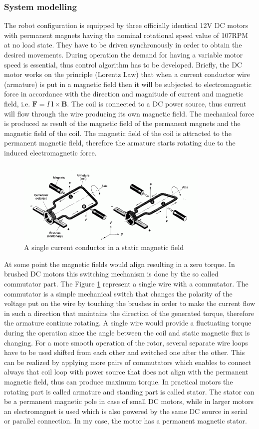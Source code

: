\documentclass[12pt,english]{article}
\begin{document}
\subsubsection{System modelling}
The robot configuration is equipped by three officially identical 12V DC motors with permanent magnets having the nominal rotational speed value of 107RPM at no load state. They have to be driven synchronously in order to obtain the desired movements. During operation the demand for having a variable motor speed is essential, thus control algorithm has to be developed. 
Briefly, the DC motor works on the principle (Lorentz Law) that when a current conductor wire (armature) is put in a magnetic field then it will be subjected to electromagnetic force in accordance with the direction and magnitude of current and magnetic field, i.e. $\mathbf{F} = I~\mathbf{l} \times \mathbf{B}$. The coil is connected to a DC power source, thus current will flow through the wire producing its own magnetic field. The mechanical force is produced as result of the magnetic field of the permanent magnets and the magnetic field of the coil. The magnetic field of the coil is attracted to the permanent magnetic field, therefore the armature starts rotating due to the induced electromagnetic force.
\begin{figure}[htb!]
	\centering
	\includegraphics[height=4cm]{figures/dc_conducting_wire.png}
	\caption{A single current conductor in a static magnetic field \cite{dc_motor_2}}
	\label{dc_conducting_wire}
\end{figure}
At some point the magnetic fields would align resulting in a zero torque. In brushed DC motors this switching mechanism is done by the so called commutator part. The Figure \ref{dc_conducting_wire} represent a single wire with a commutator. The commutator is a simple mechanical switch that changes the polarity of the voltage put on the wire by touching the brushes in order to make the current flow in such a direction that maintains the direction of the generated torque, therefore the armature continue rotating. A single wire would provide a fluctuating torque during the operation since the angle between the coil and static magnetic flux is changing. For a more smooth operation of the rotor, several separate wire loops have to be used shifted from each other and switched one after the other. This can be realized by applying more pairs of commutators which enables to connect always that coil loop with power source that does not align with the permanent magnetic field, thus can produce maximum torque. In practical motors the rotating part is called armature and standing part is called stator. The stator can be a permanent magnetic pole in case of small DC motors, while in larger motors an electromagnet is used which is also powered by the same DC source in serial or parallel connection. In my case, the motor has a permanent magnetic stator.
\end{document}
